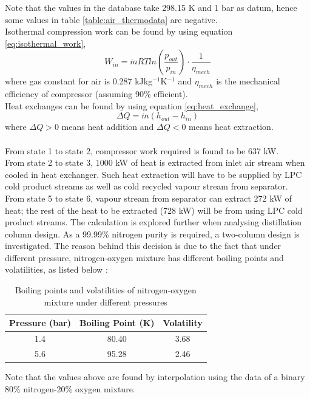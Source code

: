         \noindent Note that the values in the database take 298.15 K and 1 bar as datum, hence some values in table \ref{table:air_thermodata} are negative.\\
        \noindent Isothermal compression work can be found by using equation \ref{eq:isothermal_work},
        \begin{equation}
            W_{in} = \dot{m} RT ln\left(\frac{p_{out}}{p_{in}}\right)\cdot\frac{1}{\eta_{mech}}
            \label{eq:isothermal_work}
        \end{equation}
        where gas constant for air is 0.287 kJkg$^{-1}$K$^{-1}$ \citep{HLT} and ${\eta}_{mech}$ is the mechanical efficiency of compressor (assuming 90\% efficient). \\
        Heat exchanges can be found by using equation \ref{eq:heat_exchange},
        \begin{equation}
            \Delta Q = \dot{m} (h_{out} - h_{in})
            \label{eq:heat_exchange}
        \end{equation}
        where $\Delta Q > 0$ means heat addition and $\Delta Q < 0$ means heat extraction. \\
        \\
        From state 1 to state 2, compressor work required is found to be 637 kW. \\
        From state 2 to state 3, 1000 kW of heat is extracted from inlet air stream when cooled in heat exchanger. Such heat extraction will have to be supplied by LPC cold product streams as well as cold recycled vapour stream from separator. \\
        From state 5 to state 6, vapour stream from separator can extract 272 kW of heat; the rest of the heat to be extracted (728 kW) will be from using LPC cold product streams. The calculation is explored further when analysing distillation column design.
        As a 99.99\% nitrogen purity is required, a two-column design is investigated. The reason behind this decision is due to the fact that under different pressure, nitrogen-oxygen mixture has different boiling points and volatilities, as listed below \citep{VLEdata}:
        \begin{table}[H]
            \singlespacing
            \centering
	        \caption{Boiling points and volatilities of nitrogen-oxygen mixture under different pressures}
	        \label{table:BP_volatilities_of_mixture}
	
	        \begin{tabular}{|c|c|c|}
	        \hline
	        Pressure (bar)	& Boiling Point (K)	& Volatility \textalpha \\  \hline
	        1.4				& 80.40				& 3.68 \\   \hline
	        5.6				& 95.28				& 2.46 \\   \hline
	        \end{tabular}
	        \vspace{1ex}
	        
	        \raggedright Note that the values above are found by interpolation using the data of a binary 80\% nitrogen-20\% oxygen mixture.
        \end{table}
